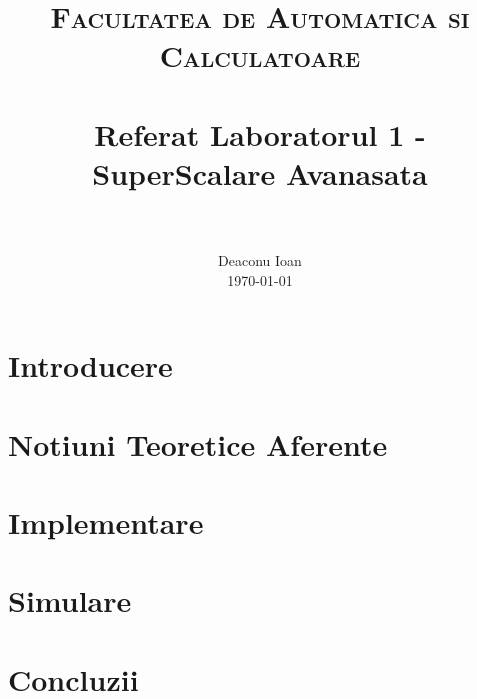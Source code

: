\documentclass[paper=a4, fontsize=11pt]{scrartcl}
\title{
		\usefont{OT1}{bch}{b}{n}
		\normalfont \normalsize \textsc{Facultatea de Automatica si Calculatoare} \\ [25pt]
		\horrule{0.5pt} \\[0.4cm]
		\huge Referat Laboratorul 1 - SuperScalare Avanasata \\
		\horrule{2pt} \\[0.5cm]
}
\author{
		\normalfont 								\normalsize
        Deaconu Ioan\\[-3pt]		\normalsize
        \today
}
\date{}
\numberwithin{equation}{section}		%
\numberwithin{figure}{section}			%
\numberwithin{table}{section}				%
\begin{document}
 
\maketitle

\section{Introducere}
\label{sec:introducere}


\section{Notiuni Teoretice Aferente}
\label{sec:notiuniteoretice}


\section{Implementare}
\label{sec:implementare}


\section{Simulare} 
\label{sec:simulare}


\section{Concluzii} 
\label{sec:concluzii}




\end{document}
